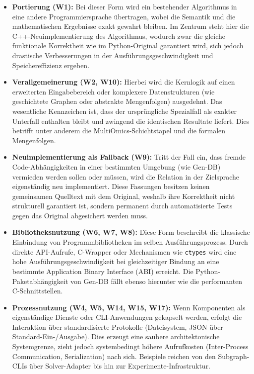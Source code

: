 \documentclass[a4paper,12pt,twoside]{report}
\DeclareRobustCommand{\_}{\textunderscore\allowbreak{}}
\theoremstyle{definition}
\newcommand{\W}[1]{\textbf{W#1}}
\begin{document}
\begin{itemize}
    \item \textbf{Portierung (\W{1}):} Bei dieser Form wird ein bestehender Algorithmus in eine andere Programmiersprache übertragen, wobei die Semantik und die mathematischen Ergebnisse exakt gewahrt bleiben. Im Zentrum steht hier die C++-Neuimplementierung des Algorithmus, wodurch zwar die gleiche funktionale Korrektheit wie im Python-Original garantiert wird, sich jedoch drastische Verbesserungen in der Ausführungsgeschwindigkeit und Speichereffizienz ergeben.
    
    \item \textbf{Verallgemeinerung (\W{2}, \W{10}):} Hierbei wird die Kernlogik auf einen erweiterten Eingabebereich oder komplexere Datenstrukturen (wie geschichtete Graphen oder abstrakte Mengenfolgen) ausgedehnt. Das wesentliche Kennzeichen ist, dass der ursprüngliche Spezialfall als exakter Unterfall enthalten bleibt und zwingend die identischen Resultate liefert. Dies betrifft unter anderem die MultiOmics-Schichtstapel und die formalen Mengenfolgen.
    
    \item \textbf{Neuimplementierung als Fallback (\W{9}):} Tritt der Fall ein, dass fremde Code-Abhängigkeiten in einer bestimmten Umgebung (wie Gen-DB) vermieden werden sollen oder müssen, wird die Relation in der Zielsprache eigenständig neu implementiert. Diese Fassungen besitzen keinen gemeinsamen Quelltext mit dem Original, weshalb ihre Korrektheit nicht strukturell garantiert ist, sondern permanent durch automatisierte Tests gegen das Original abgesichert werden muss.
    
    \item \textbf{Bibliotheksnutzung (\W{6}, \W{7}, \W{8}):} Diese Form beschreibt die klassische Einbindung von Programmbibliotheken im selben Ausführungsprozess. Durch direkte API-Aufrufe, C-Wrapper oder Mechanismen wie \texttt{ctypes} wird eine hohe Ausführungsgeschwindigkeit bei gleichzeitiger Bindung an eine bestimmte Application Binary Interface (ABI) erreicht. Die Python-Paketabhängigkeit von Gen-DB fällt ebenso hierunter wie die performanten C-Schnittstellen.
    
    \item \textbf{Prozessnutzung (\W{4}, \W{5}, \W{14}, \W{15}, \W{17}):} Wenn Komponenten als eigenständige Dienste oder CLI-Anwendungen gekapselt werden, erfolgt die Interaktion über standardisierte Protokolle (Dateisystem, JSON über Standard-Ein-/Ausgabe). Dies erzeugt eine saubere architektonische Systemgrenze, zieht jedoch systembedingt höhere Aufrufkosten (Inter-Process Communication, Serialization) nach sich. Beispiele reichen von den Subgraph-CLIs über Solver-Adapter bis hin zur Experimente-Infrastruktur.
    

\end{itemize}
\end{document}
